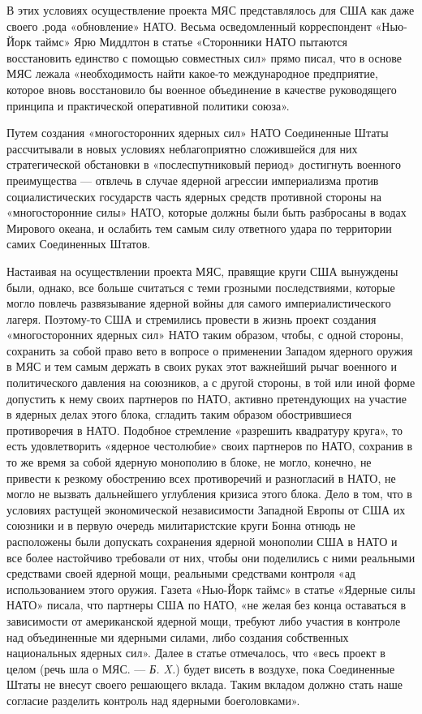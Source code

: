 \documentclass[12pt, a4paper, openany]{book}
\begin{document}
		В этих условиях осуществление проекта МЯС представлялось для США как даже своего .рода «обновление» НАТО. Весьма осведомленный корреспондент «Нью-Йорк таймс» Ярю Миддлтон в статье «Сторонники НАТО пытаются восстановить единство с помощью совместных сил» прямо писал, что в основе МЯС лежала «необходимость найти какое-то международное предприятие, которое вновь восстановило бы военное объединение в качестве руководящего принципа и практической оперативной политики союза».
		
		
		Путем создания «многосторонних ядерных сил» НАТО Соединенные Штаты рассчитывали в новых условиях неблагоприятно сложившейся для них стратегической обстановки в «послеспутниковый период» достигнуть военного преимущества — отвлечь в случае ядерной агрессии империализма против социалистических государств часть ядерных средств противной стороны на «многосторонние силы» НАТО, которые должны были быть разбросаны в водах Мирового океана, и ослабить тем самым силу ответного удара по территории самих Соединенных Штатов.
		
		Настаивая на осуществлении проекта МЯС, правящие круги США вынуждены были, однако, все больше считаться с теми грозными последствиями, которые могло повлечь развязывание ядерной войны для самого империалистического лагеря. Поэтому-то США и стремились провести в жизнь проект создания «многосторонних ядерных сил» НАТО таким образом, чтобы, с одной стороны, сохранить за собой право вето в вопросе о применении Западом ядерного оружия в МЯС и тем самым держать в своих руках этот важнейший рычаг военного и политического давления на союзников, а с другой стороны, в той или иной форме допустить к нему своих партнеров по НАТО, активно претендующих на участие в ядерных делах этого блока, сгладить таким образом обострившиеся противоречия в НАТО. Подобное стремление «разрешить квадратуру круга», то есть удовлетворить «ядерное честолюбие» своих партнеров по НАТО, сохранив в то же время за собой ядерную монополию в блоке, не могло, конечно, не привести к резкому обострению всех противоречий и разногласий в НАТО, не могло не вызвать дальнейшего углубления кризиса этого блока. Дело в том, что в условиях растущей экономической независимости Западной Европы от США их союзники и в первую очередь милитаристские круги Бонна отнюдь не расположены были допускать сохранения ядерной монополии США в НАТО и все более настойчиво требовали от них, чтобы они поделились с ними реальными средствами своей ядерной мощи, реальными средствами контроля «ад использованием этого оружия. Газета «Нью-Йорк таймс» в статье «Ядерные силы НАТО» писала, что партнеры США по НАТО, «не желая без конца оставаться в зависимости от американской ядерной мощи, требуют либо участия в контроле над объединенные ми ядерными силами, либо создания собственных национальных ядерных сил». Далее в статье отмечалось, что «весь проект в целом (речь шла о МЯС. — \textit{Б. X.}) будет висеть в воздухе, пока Соединенные Штаты не внесут своего решающего вклада. Таким вкладом должно стать наше согласие разделить контроль над ядерными боеголовками».
		
\end{document}
